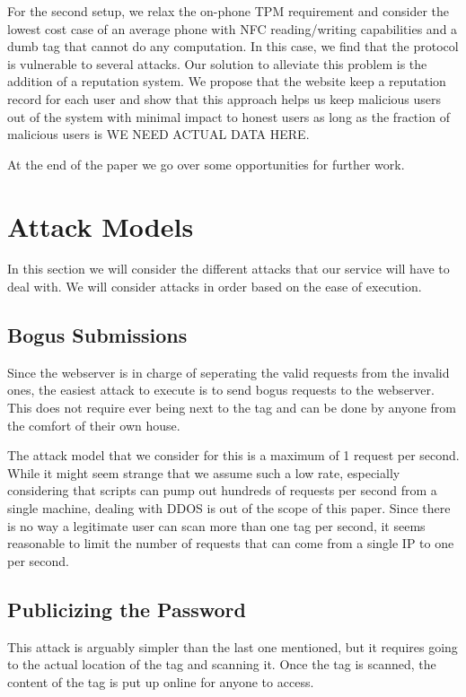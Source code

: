\documentclass{sig-alternate}
\begin{document}
For the second setup, we relax the on-phone TPM requirement and
consider the lowest cost case of an average phone with NFC
reading/writing capabilities and a dumb tag that cannot do any
computation. In this case, we find that the protocol is vulnerable to
several attacks. Our solution to alleviate this problem is the
addition of a reputation system. We propose that the website keep a
reputation record for each user and show that this approach helps us
keep malicious users out of the system with minimal impact to honest
users as long as the fraction of malicious users is WE NEED ACTUAL
DATA HERE.

At the end of the paper we go over some opportunities for further
work.

\section{Attack Models}
In this section we will consider the different attacks that our
service will have to deal with. We will consider attacks in order
based on the ease of execution.

\subsection{Bogus Submissions}
Since the webserver is in charge of seperating the valid requests from
the invalid ones, the easiest attack to execute is to send bogus
requests to the webserver. This does not require ever being next to
the tag and can be done by anyone from the comfort of their own
house. 

The attack model that we consider for this is a maximum of 1 request
per second. While it might seem strange that we assume such a low
rate, especially considering that scripts can pump out hundreds of
requests per second from a single machine, dealing with DDOS is out of
the scope of this paper. Since there is no way a legitimate user can
scan more than one tag per second, it seems reasonable to limit the
number of requests that can come from a single IP to one per second.

\subsection{Publicizing the Password}
This attack is arguably simpler than the last one mentioned, but it
requires going to the actual location of the tag and scanning it. Once
the tag is scanned, the content of the tag is put up online for anyone
to access.
\end{document}
